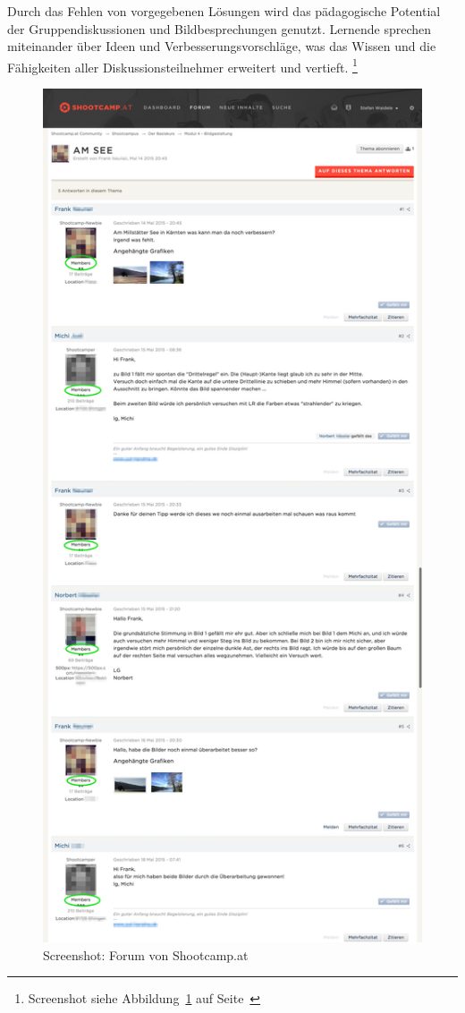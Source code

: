 Durch das Fehlen von vorgegebenen Lösungen wird das pädagogische Potential der Gruppendiskussionen und Bildbesprechungen genutzt. Lernende sprechen miteinander über Ideen und Verbesserungsvorschläge, was das Wissen und die Fähigkeiten aller Diskussionsteilnehmer erweitert und vertieft. \footnote{Screenshot siehe Abbildung~\ref{fig:scamp} auf Seite~\pageref{fig:scamp}}
\begin{figure}[p]
\begin{center}
\includegraphics[width=.7\textwidth]{shootcamp.jpg}
\caption{Screenshot: Forum von Shootcamp.at}
\label{fig:scamp}
\end{center}
\end{figure}

